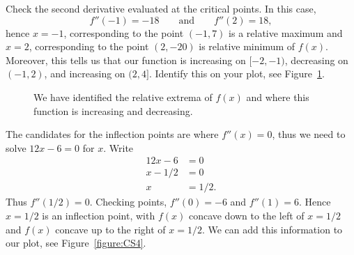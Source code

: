 Check the second derivative evaluated at the critical points. In this
case,
\[
f''(-1) = -18 \qquad\text{and}\qquad f''(2) = 18,
\]
hence $x=-1$, corresponding to the point $(-1,7)$ is a relative maximum
and $x=2$, corresponding to the point $(2,-20)$ is relative minimum of
$f(x)$. Moreover, this tells us that our function is increasing on
$[-2,-1)$, decreasing on $(-1,2)$, and increasing on $(2,4]$. Identify
this on your plot, see Figure~\ref{figure:CS3}. \cite{mooc}
\begin{figure}[H]
    \centering
{}
\caption{We have identified the relative extrema of $f(x)$ and where this
  function is increasing and decreasing. \cite{mooc}}
\label{figure:CS3}
\end{figure}


The candidates for the inflection points are where $f''(x) = 0$, thus
we need to solve $12x-6=0$ for $x$.  Write
\begin{align*}
12x-6 &=0\\
x - 1/2 &=0\\
x &=1/2.
\end{align*}
Thus $f''(1/2) = 0$. Checking points, $f''(0) = -6$ and $f''(1) = 6$.
Hence $x=1/2$ is an inflection point, with $f(x)$ concave down to the
left of $x=1/2$ and $f(x)$ concave up to the right of $x=1/2$. We can
add this information to our plot, see Figure~\ref{figure:CS4}. \cite{mooc}

